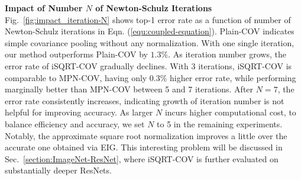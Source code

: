 \documentclass[10pt,twocolumn,letterpaper]{article}
\begin{document}
\vspace{4pt}\noindent\textbf{Impact of  Number $N$ of Newton-Schulz Iterations}\quad 
Fig.~\ref{fig:impact_iteration-N} shows top-1 error rate as a function of  number  of Newton-Schulz iterations in Eqn.  (\ref{equ:coupled-equation}). Plain-COV indicates simple covariance pooling without any normalization. With one single iteration, our method outperforms Plain-COV by $1.3\%$. As iteration number grows, the error rate of iSQRT-COV gradually declines. With 3 iterations, iSQRT-COV is comparable to MPN-COV, having only 0.3\% higher error rate, while performing marginally better than MPN-COV between 5 and 7 iterations. After $N=7$, the error rate consistently increases, indicating growth of iteration number is not helpful for improving accuracy. As larger $N$ incurs higher computational cost, to balance efficiency and accuracy, we set $N$ to 5  in the remaining experiments. Notably, the approximate square root normalization improves a little over the accurate one obtained via EIG. This interesting problem will be discussed in  Sec.~\ref{section:ImageNet-ResNet}, where iSQRT-COV is further evaluated on substantially deeper ResNets.
\end{document}
